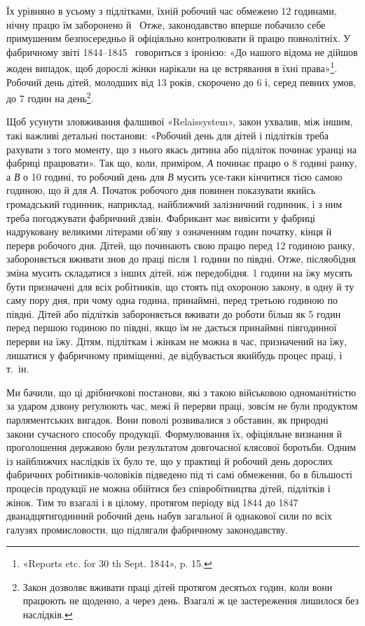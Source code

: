 \parcont{}  %
Їх урівняно в усьому з підлітками, їхній робочий час обмежено
12 годинами, нічну працю їм заборонено й~ Отже, законодавство
вперше побачило себе примушеним безпосередньо й офіціяльно
контролювати й працю повнолітніх. У фабричному звіті 1844--1845~
говориться з іронією: «До нашого відома не дійшов
жоден випадок, щоб дорослі жінки нарікали на це встрявання
в їхні права»\footnote{
«Reports etc. for 30 th Sept. 1844», p. 15.
}. Робочий день дітей, молодших від 13 років,
скорочено до 6 і, серед певних умов, до 7 годин на день\footnote{
Закон дозволяє вживати праці дітей протягом десятьох годин,
коли вони працюють не щоденно, а через день. Взагалі ж це застереження
лишилося без наслідків.
}.

Щоб усунути зловживання фалшивої «Relaissystem», закон
ухвалив, між іншим, такі важливі детальні постанови: «Робочий
день для дітей і підлітків треба рахувати з того моменту, що з
нього якась дитина або підліток починає уранці на фабриці
працювати». Так що, коли, приміром, \emph{А} починає працю о 8 годині
ранку, а \emph{В} о 10 годині, то робочий день для \emph{В} мусить усе-таки кінчитися тією самою годиною, що й для
\emph{А}. Початок робочого
дня повинен показувати якийсь громадський годинник, наприклад,
найближчий залізничний годинник, і з ним треба погоджувати
фабричний дзвін. Фабрикант має вивісити у фабриці надруковану
великими літерами об’яву з означенням годин початку,
кінця й перерв робочого дня. Дітей, що починають свою працю
перед 12 годиною ранку, забороняється вживати знов до праці
після 1 години по півдні. Отже, післяобідня зміна мусить складатися
з інших дітей, ніж передобідня. 1 години на їжу мусять
бути призначені для всіх робітників, що стоять під охороною закону,
в одну й ту саму пору дня, при чому одна година, принаймні,
перед третьою годиною по півдні. Дітей або підлітків забороняється
вживати до роботи більш як 5 годин перед першою годиною
по півдні, якщо їм не дається принаймні півгодинної перерви на
їжу. Дітям, підліткам і жінкам не можна в час, призначений на
їжу, лишатися у фабричному приміщенні, де відбувається якийбудь
процес праці, і т.~ін.

Ми бачили, що ці дрібничкові постанови, які з такою військовою
одноманітністю за ударом дзвону реґулюють час, межі й
перерви праці, зовсім не були продуктом парляментських вигадок.
Вони поволі розвивалися з обставин, як природні закони
сучасного способу продукції. Формулювання їх, офіціяльне
визнання й проголошення державою були результатом довгочасної
клясової боротьби. Одним із найближчих наслідків їх
було те, що у практиці й робочий день дорослих фабричних робітників-чоловіків
підведено під ті самі обмеження, бо в більшості
процесів продукції не можна обійтися без співробітництва дітей,
підлітків і жінок. Тим то взагалі і в цілому, протягом періоду
від 1844 до 1847~ дванадцятигодинний робочий день набув загальної
й однакової сили по всіх галузях промисловости, що
підлягали фабричному законодавству.
